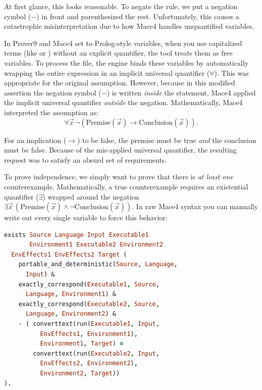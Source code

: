 At first glance, this looks reasonable. To negate the rule, we put a negation symbol ($-$) in front and parenthesized the rest. Unfortunately, this causes a catastrophic misinterpretation due to how Mace4 handles unquantified variables.

In Prover9 and Mace4 set to Prolog-style variables, when you use capitalized terms (like  or ) without an explicit quantifier, the tool treats them as free variables. To process the file, the engine binds these variables by automatically wrapping the entire expression in an implicit universal quantifier ($\forall$). This was appropriate for the original assumption. However, because in this modified assertion the negation symbol ($-$) is written \emph{inside} the statement, Mace4 applied the implicit universal quantifier \emph{outside} the negation. Mathematically, Mace4 interpreted the assumption as:
\[\forall \vec{x} \, \neg (\text{Premise}(\vec{x}) \rightarrow \text{Conclusion}(\vec{x})).\]

For an implication ($\rightarrow$) to be false, the premise must be true \emph{and} the conclusion must be false. Because of the mis-applied universal quantifier, the resulting request was to satisfy an absurd set of requirements.

To prove independence, we simply want to prove that there is \emph{at least one} counterexample. Mathematically, a true counterexample requires an existential quantifier ($\exists$) wrapped around the negation $\exists \vec{x} \, (\text{Premise}(\vec{x}) \land \neg \text{Conclusion}(\vec{x}))$. In raw Mace4 syntax you can manually write out every single variable to force this behavior:

\noindent
\begin{minipage}{\columnwidth}
\begin{lstlisting}[language=Prolog, caption={Tediously forcing the intended existential by naming every variable by hand.}]
exists Source Language Input Executable1
       Environment1 Executable2 Environment2
  EnvEffects1 EnvEffects2 Target (
    portable_and_deterministic(Source, Language,
      Input) &
    exactly_correspond(Executable1, Source,
      Language, Environment1) &
    exactly_correspond(Executable2, Source,
      Language, Environment2) &
    - ( converttext(run(Executable1, Input,
          EnvEffects1, Environment1),
          Environment1, Target) =
        converttext(run(Executable2, Input,
          EnvEffects2, Environment2),
          Environment2, Target))
).
\end{lstlisting}
\end{minipage}

